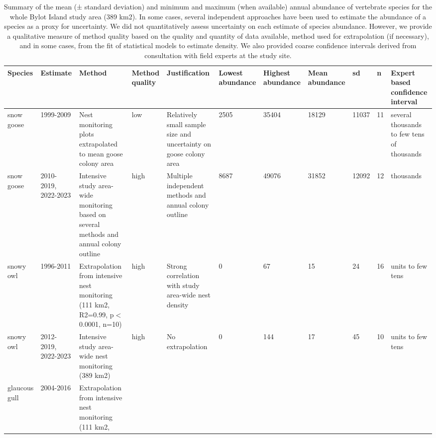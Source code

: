 \begingroup\fontsize{8pt}{10pt}\selectfont
\begin{longtable}{|p{}|p{}|p{}|p{}|p{}|p{}|p{}|p{}|p{}|p{}|p{}|}
\caption{Summary of the mean (± standard deviation) and minimum and maximum (when available) annual abundance of vertebrate species for the whole Bylot Island study area (389 km2).  In some cases, several independent approaches have been used to estimate the abundance of a species as a proxy for uncertainty. We did not quantitatively assess uncertainty on each estimate of species abundance. However, we provide a qualitative measure of method quality based on the quality and quantity of data available, method used for extrapolation (if necessary), and in some cases, from the fit of statistical models to estimate density. We also provided coarse confidence intervals derived from consultation with field experts at the study site.} \\ 
  \hline
{\textbf{Species}} & {\textbf{Estimate}} & {\textbf{Method}} & {\textbf{Method quality}} & {\textbf{Justification}} & {\textbf{Lowest abundance}} & {\textbf{Highest abundance}} & {\textbf{Mean abundance}} & {\textbf{sd}} & {\textbf{n}} & {\textbf{Expert based confidence interval}} \\ 
  \hline
snow goose & 1999-2009 & Nest monitoring plots extrapolated to mean goose colony area & low & Relatively small sample size and uncertainty on goose colony area  & 2505 & 35404 & 18129 & 11037 &  11 & several thousands to few tens of thousands \\ 
   \hline
snow goose & 2010-2019, 2022-2023 & Intensive study area-wide monitoring based on several
methods and annual colony outline & high & Multiple independent methods and annual colony outline & 8687 & 49076 & 31852 & 12092 &  12 & thousands \\ 
   \hline
snowy owl & 1996-2011 & Extrapolation from intensive nest monitoring (111 km2,
R2=0.99, p$<$0.0001, n=10) & high & Strong correlation with study area-wide nest density &   0 &  67 & 15 & 24 &  16 & units to few tens \\ 
   \hline
snowy owl & 2012-2019, 2022-2023 & Intensive study area-wide nest monitoring (389 km2) & high & No extrapolation &   0 & 144 & 17 & 45 &  10 & units to few tens \\ 
   \hline
glaucous gull & 2004-2016 & Extrapolation from intensive nest monitoring (111 km2,

\end{longtable}
